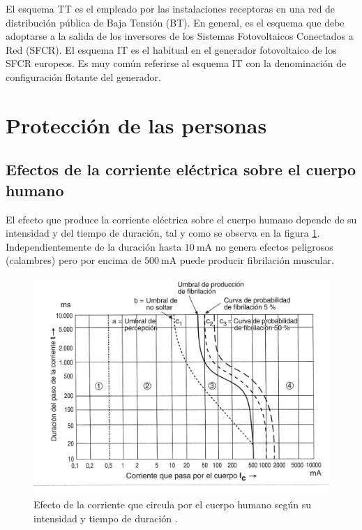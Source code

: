 El esquema TT es el empleado por las instalaciones receptoras en una
red de distribución pública de Baja Tensión (BT). En general, es el
esquema que debe adoptarse a la salida de los inversores de los Sistemas
Fotovoltaicos Conectados a Red (SFCR). El esquema IT es el habitual
en el generador fotovoltaico de los SFCR europeos. Es muy común referirse
al esquema IT con la denominación de configuración flotante del generador.


\section{Protección de las personas}


\subsection{Efectos de la corriente eléctrica sobre el cuerpo humano}

El efecto que produce la corriente eléctrica sobre el cuerpo humano
depende de su intensidad y del tiempo de duración, tal y como se observa
en la figura \ref{fig:EfectoCorriente}. Independientemente de la
duración hasta $\SI{10}{\milli\ampere}$ no genera efectos peligrosos
(calambres) pero por encima de $\SI{500}{\milli\ampere}$ puede producir
fibrilación muscular.

%
\begin{figure}
\includegraphics[scale=0.23]{../figs/CurvaIntensidadContactoTiempo}

\caption[Efecto de la corriente que circula por el cuerpo humano]{Efecto de la corriente que circula por el cuerpo humano según su
intensidad y tiempo de duración \cite{PerezGabarda2000,PerezGabarda2000a}.\label{fig:EfectoCorriente}}

\end{figure}


